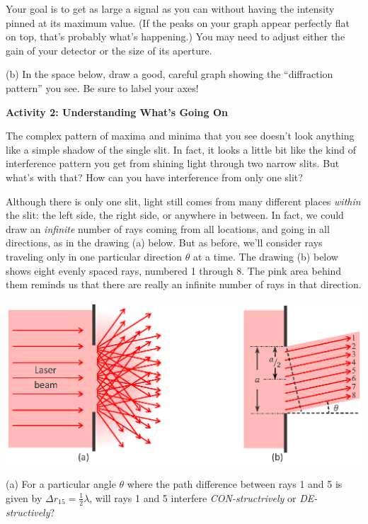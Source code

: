 Your goal is to get as large a signal as you can without having the intensity pinned at its maximum value.  (If the peaks on your graph appear perfectly flat on top, that's probably what's happening.) You may need to adjust either the gain of your detector or the size of its aperture.

(b) In the space below, draw a good, careful graph showing the ``diffraction pattern'' you see.  
Be sure to label your axes!
\answerspace{1.5in}

\pagebreak[2]
\textbf{Activity 2: Understanding What's Going On}

The complex pattern of maxima and minima that you see doesn't look anything like a simple shadow of the single slit.  In fact, it looks a little bit like the kind of interference pattern you get from shining light through two narrow slits.  But what's with that?  How can you have interference from only one slit?

Although there is only one slit, light still comes from many different places \textit{within} the slit: the left side, the right side, or anywhere in between.  In fact, we could draw an \textit{infinite} number of rays coming from all locations, and going in all directions, as in the drawing (a) below.  But as before, we'll consider rays traveling only in one particular direction $\theta$ at a time.  The drawing (b) below shows eight evenly spaced rays, numbered 1 through 8.  The pink area behind them reminds us that there are really an infinite number of rays in that direction.

\answerspace{0.2in}
\begin{center}
\includegraphics{diffraction_of_light/one_slit_rays_color.eps}
\end{center}
\answerspace{0.2in}

(a) For a particular angle $\theta$ where the path difference between rays 1 and 5 is given by $\Delta r_{15}=\frac{1}{2}\lambda$, will rays 1 and 5 interfere \textit{CON-structrively} or \textit{DE-structively}?
\answerspace{0.4in}

